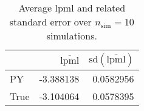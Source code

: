 \begin{table}[H]

\caption{Average lpml and related standard error over $n_{\text{sim}} = 10$ simulations.}
\centering
\begin{tabular}[t]{lrr}
\toprule
  & $\overbar{\text{lpml}}$ & $\text{sd}(\overbar{\text{lpml}})$\\
\midrule
PY & -3.388138 & 0.0582956\\
True & -3.104064 & 0.0578395\\
\bottomrule
\end{tabular}
\end{table}